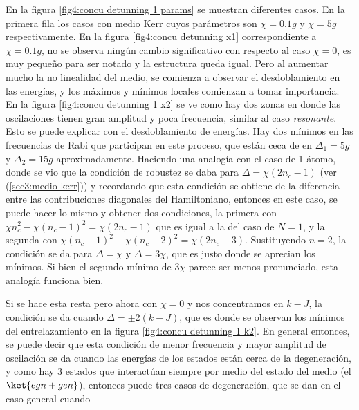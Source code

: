 En la figura \ref{fig4:concu detunning 1 params} se muestran diferentes casos. En la primera fila los casos con medio Kerr cuyos parámetros son $\chi=0.1g$ y $\chi=5g$ respectivamente. En la figura \ref{fig4:concu detunning x1} correspondiente a $\chi=0.1g$, no se observa ningún cambio significativo con respecto al caso $\chi=0$, es muy pequeño para ser notado y la estructura queda igual. Pero al aumentar mucho la no linealidad del medio, se comienza a observar el desdoblamiento en las energías, y los máximos y mínimos locales comienzan a tomar importancia. En la figura \ref{fig4:concu detunning 1 x2} se ve como hay dos zonas en donde las oscilaciones tienen gran amplitud y poca frecuencia, similar al caso \textit{resonante}. Esto se puede explicar con el desdoblamiento de energías. Hay dos mínimos en las frecuencias de Rabi que participan en este proceso, que están ceca de en $\Delta_1=5g$ y $\Delta_2=15g$ aproximadamente. Haciendo una analogía con el caso de 1 átomo, donde se vio que la condición de robustez se daba para $\Delta=\chi(2n_c-1)$ (ver (\ref{sec3:medio kerr})) y recordando que esta condición se obtiene de la diferencia entre las contribuciones diagonales del Hamiltoniano, entonces en este caso, se puede hacer lo mismo y obtener dos condiciones, la primera con $\chi n_c^2-\chi(n_c-1)^2=\chi(2n_c-1)$ que es igual a la del caso de $N=1$, y la segunda con $\chi(n_c-1)^2-\chi(n_c-2)^2=\chi(2n_c-3)$. Sustituyendo $n=2$, la condición se da para $\Delta=\chi$ y $\Delta=3\chi$, que es justo donde se aprecian los mínimos. Si bien el segundo mínimo de $3\chi$ parece ser menos pronunciado, esta analogía funciona bien.

Si se hace esta resta pero ahora con $\chi=0$ y nos concentramos en $k-J$, la condición se da cuando $\Delta=\pm 2(k-J)$, que es donde se observan los mínimos del entrelazamiento en la figura \ref{fig4:concu detunning 1 k2}. En general entonces, se puede decir que esta condición de menor frecuencia y mayor amplitud de oscilación se da cuando las energías de los estados están cerca de la degeneración, y como hay 3 estados que interactúan siempre por medio del estado del medio (el $\ket{egn+gen}$), entonces puede tres casos de degeneración, que se dan en el caso general cuando

